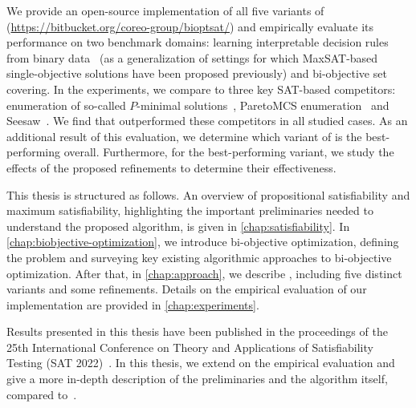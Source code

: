 We provide an open-source implementation of all five variants of \algname{} ({\small\url{https://bitbucket.org/coreo-group/bioptsat/}}) and empirically evaluate its performance on two benchmark domains:
learning interpretable decision rules from binary data~\autocite{DBLP:conf/cp/MaliotovM18} (as a generalization of settings for which MaxSAT-based single-objective solutions have been proposed previously) and bi-objective set covering.
In the experiments, we compare \algname{} to three key SAT-based competitors:
enumeration of so-called $P$-minimal solutions~\autocite{DBLP:conf/cp/SohBTB17}, ParetoMCS enumeration~\autocite{DBLP:conf/ijcai/Terra-NevesLM18a} and Seesaw~\autocite{DBLP:conf/cp/JanotaMSM21}.
We find that \algname{} outperformed these competitors in all studied cases.
As an additional result of this evaluation, we determine which variant of \algname{} is the best-performing overall.
Furthermore, for the best-performing variant, we study the effects of the proposed refinements to determine their effectiveness.

This thesis is structured as follows.
An overview of propositional satisfiability and maximum satisfiability, highlighting the important preliminaries needed to understand the proposed algorithm, is given in \cref{chap:satisfiability}.
In \cref{chap:biobjective-optimization}, we introduce bi-objective optimization, defining the problem and surveying key existing algorithmic approaches to bi-objective optimization.
After that, in \cref{chap:approach}, we describe \algname{}, including five distinct variants and some refinements.
Details on the empirical evaluation of our implementation are provided in \cref{chap:experiments}.

Results presented in this thesis have been published in the proceedings of the 25th International Conference on Theory and Applications of Satisfiability Testing (SAT 2022)~\autocite{JabsEtAl2022MaxSATBasedBi}.
In this thesis, we extend on the empirical evaluation and give a more in-depth description of the preliminaries and the algorithm itself, compared to~\autocite{JabsEtAl2022MaxSATBasedBi}.